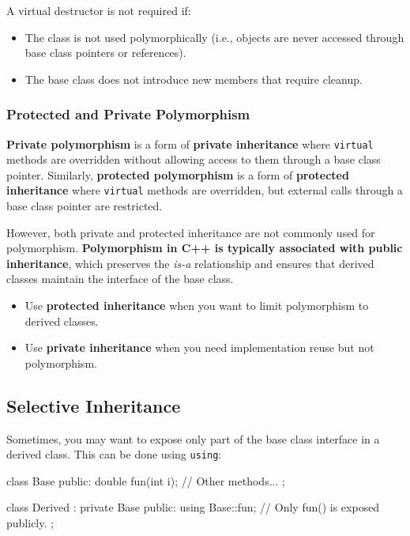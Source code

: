 A virtual destructor is not required if:
\begin{itemize}
    \item The class is not used polymorphically (i.e., objects are never accessed through base class pointers or references).
    \item The base class does not introduce new members that require cleanup.
\end{itemize}

\subsubsection{Protected and Private Polymorphism}

\textbf{Private polymorphism} is a form of \textbf{private inheritance} where \texttt{virtual} methods are overridden without allowing access to them through a base class pointer. Similarly, \textbf{protected polymorphism} is a form of \textbf{protected inheritance} where \texttt{virtual} methods are overridden, but external calls through a base class pointer are restricted.

However, both private and protected inheritance are not commonly used for polymorphism. \textbf{Polymorphism in C++ is typically associated with public inheritance}, which preserves the \textit{is-a} relationship and ensures that derived classes maintain the interface of the base class.

\begin{observationblock}
    \begin{itemize}
        \item Use \textbf{protected inheritance} when you want to limit polymorphism to derived classes.
        \item Use \textbf{private inheritance} when you need implementation reuse but not polymorphism.
    \end{itemize}
\end{observationblock}

\subsection{Selective Inheritance}

Sometimes, you may want to expose only part of the base class interface in a derived class. This can be done using \texttt{using}:

\begin{codeblock}[language=C++, numbers=none]
class Base {
public:
    double fun(int i);
    // Other methods...
};

class Derived : private Base {
public:
    using Base::fun; // Only fun() is exposed publicly.
};
\end{codeblock}

